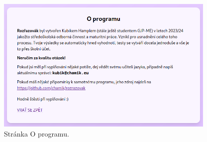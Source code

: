 \begin{figure}[H]
    \centering
    \includegraphics[width=400px]{images/01design/about.png}
    \caption{Stránka O programu.}
\end{figure}
